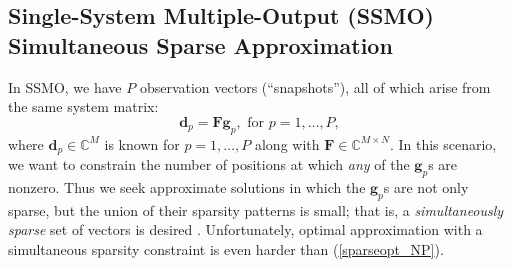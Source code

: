 \documentclass[final]{siamltex}
\newcommand{\field}[1]{\mathbb{#1}}
\newcommand{\la}[1]{\mbox{$\mathbf{#1}$}}  \newcommand{\sst}[1]{\mbox{\scriptsize{#1}}}
\begin{document}
\subsection{Single-System Multiple-Output (SSMO) Simultaneous Sparse Approximation}

   In SSMO, we have $P$ observation vectors (``snapshots''), all of
   which arise from the same system matrix:
   \begin{equation}\label{mult_obs} 
        \la{d}_p = \la{F} \la{g}_p, \,\,\mbox{for } p = 1, \ldots, P,
   \end{equation}
   where $\la{d}_p \in \field{C}^{M}$ is known for $p = 1, \ldots, P$
   along with $\la{F} \in \field{C}^{M \times N}$.  In this scenario,
   we want to constrain the number of positions at which \emph{any} of
   the $\la{g}_p$s are nonzero.  Thus we seek approximate solutions in
   which the $\la{g}_p$s are not only sparse, but the union of their
   sparsity patterns is small; that is, a {\em{simultaneously sparse}}
   set of vectors is desired \cite{Mal2005, Tro2006_II}.
   Unfortunately, optimal approximation with a simultaneous sparsity
   constraint is even harder than (\ref{sparseopt_NP}).
\end{document}
